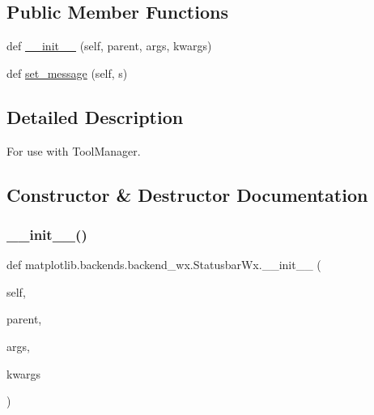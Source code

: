 \subsection*{Public Member Functions}
\begin{DoxyCompactItemize}
\item 
def \hyperlink{classmatplotlib_1_1backends_1_1backend__wx_1_1StatusbarWx_a929aa1cc77e9b5b7bb25694f504b9cd1}{\+\_\+\+\_\+init\+\_\+\+\_\+} (self, parent, args, kwargs)
\item 
def \hyperlink{classmatplotlib_1_1backends_1_1backend__wx_1_1StatusbarWx_afad0e91946557ac0d8296f066581d1fd}{set\+\_\+message} (self, s)
\end{DoxyCompactItemize}


\subsection{Detailed Description}
\begin{DoxyVerb}For use with ToolManager.\end{DoxyVerb}
 

\subsection{Constructor \& Destructor Documentation}
\mbox{\label{classmatplotlib_1_1backends_1_1backend__wx_1_1StatusbarWx_a929aa1cc77e9b5b7bb25694f504b9cd1}} 
\subsubsection{\texorpdfstring{\+\_\+\+\_\+init\+\_\+\+\_\+()}{\_\_init\_\_()}}
{\footnotesize\ttfamily def matplotlib.\+backends.\+backend\+\_\+wx.\+Statusbar\+Wx.\+\_\+\+\_\+init\+\_\+\+\_\+ (\begin{DoxyParamCaption}\item[{}]{self,  }\item[{}]{parent,  }\item[{}]{args,  }\item[{}]{kwargs }\end{DoxyParamCaption})}



